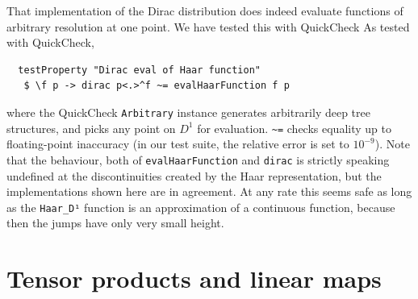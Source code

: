 \documentclass[final,sigplan]{acmart}\settopmatter{printfolios=true,printccs=false,printacmref=false}
\theoremstyle{acmplain}
\theoremstyle{acmdefinition}
\begin{document}
That implementation of the Dirac distribution does indeed evaluate functions of arbitrary resolution at one point. We have tested this with QuickCheck
As tested with QuickCheck,
\begin{lstlisting}
  testProperty "Dirac eval of Haar function"
   $ \f p -> dirac p<.>^f ~= evalHaarFunction f p
\end{lstlisting}
where the QuickCheck \lstinline`Arbitrary` instance generates arbitrarily deep tree structures, and picks any point on $D^1$ for evaluation.
\lstinline`~=` checks equality up to floating-point inaccuracy (in our test suite, the relative error  is set to $10^{-9}$).
Note that the behaviour, both of \verb`evalHaarFunction` and \verb`dirac` is strictly speaking undefined at the discontinuities created by the Haar representation, but the implementations shown here are in agreement. At any rate this seems safe as long as the \verb`Haar_D¹` function is an approximation of a continuous function, because then the jumps have only very small height.

\section{Tensor products and linear maps}
\end{document}
